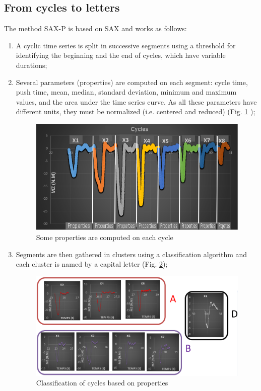 \subsection{From cycles to letters}
The method SAX-P is based on SAX and works as follows:  
\begin{enumerate}
\item A cyclic time series is split in successive segments using a threshold
for identifying the beginning and the end of cycles, which have variable
durations;	
\item Several parameters (properties) are computed on each segment: cycle
time, push time, mean, median, standard deviation, minimum and maximum
values, and the area under the time series curve. As all these parameters
have different units, they must be normalized (i.e. centered and reduced) (Fig. \ref{fig:property} );

	 \begin{figure}[h]
  \centering
   \includegraphics[scale=0.4]{images/sax-p/sax-p_deplacement_property}
    \caption{Some properties are computed on each cycle}
  \label{fig:property}
  \end{figure}
	
 
\item Segments are then gathered in clusters using a classification algorithm
\cite{Esling2012} and each cluster is named by a capital letter (Fig. \ref{fig:classification}); 

	 \begin{figure}[h]
  \centering
   \includegraphics[scale=0.4]{images/sax-p/regroupement}
    \caption{Classification of cycles based on properties}
  \label{fig:classification}
  \end{figure}
	

\end{enumerate}
